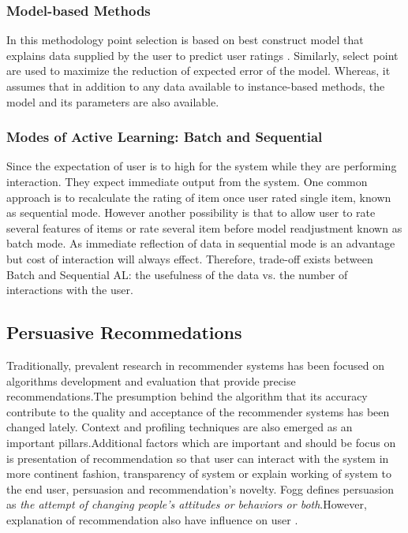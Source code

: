 \subsubsection{Model-based Methods}

In this methodology point selection is based on best construct model that explains data supplied by the user to predict user ratings \cite{adomavicius2005toward}. Similarly, select point are used to maximize the reduction of expected error of the model. Whereas, it assumes that in addition to any data available to instance-based methods, the model and its parameters are also available. 

\subsubsection{Modes of Active Learning: Batch and Sequential}

Since the expectation of user is to high for the system while they are performing interaction. They expect immediate output from the system. One common approach is to recalculate the rating of item once user rated single item, known as sequential mode. However another possibility is that to allow user to rate several features of items or rate several item before model readjustment known as batch mode. As immediate reflection of data in sequential mode is an advantage but cost of interaction will always effect. Therefore, trade-off exists between Batch and Sequential AL: the usefulness of the data vs. the number of interactions with the user. 

\subsection{Persuasive Recommedations}

Traditionally, prevalent research in recommender systems has been focused on algorithms development and evaluation that provide precise recommendations\cite{xiao2007commerce}.The presumption behind the algorithm that its accuracy contribute to the quality and acceptance of the recommender systems has been changed lately\cite{nanou2010effects}. Context and profiling techniques are also emerged as an important pillars.Additional factors which are important and should be focus on is presentation of recommendation so that user can interact with the system in more continent fashion\cite{nanou2010effects}, transparency of system or explain working of system to the end user\cite{sinha2002role}, persuasion\cite{pu2012evaluating} and recommendation’s novelty\cite{cremonesi2012investigating}. Fogg \cite{fogg1998persuasive} defines persuasion as \textit{the attempt of changing people’s attitudes or behaviors or both}.However, explanation of recommendation also have influence on user \cite{mcsherry2005explanation} \cite {herlocker2000explaining}.

